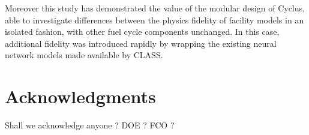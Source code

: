 \documentclass{anstrans}
\begin{document}
Moreover this study has demonstrated the value of the modular design of
Cyclus, able to investigate differences between the physics fidelity of
facility models in an isolated fashion, with other fuel cycle components
unchanged.  In this case, additional fidelity was introduced rapidly by
wrapping the existing neural network models made available by CLASS.



%

\section{Acknowledgments}
Shall we acknowledge anyone ? DOE ? FCO ?




\end{document}

